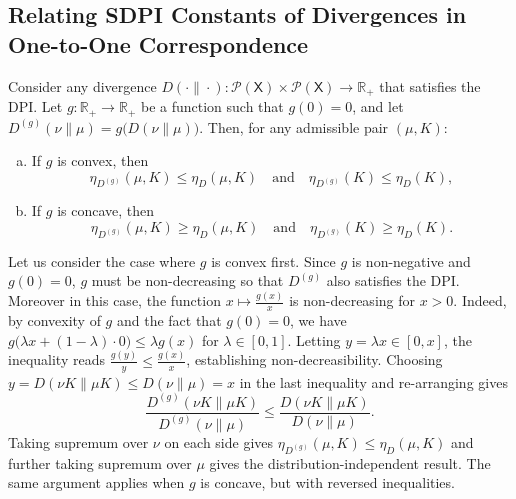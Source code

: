 \documentclass[conference,letterpaper]{IEEEtran}
\def \X{\mathsf X}
\def \calP{\mathcal P}
\def \reals {\mathbb R}
\begin{document}
\subsection{Relating SDPI Constants of Divergences in One-to-One Correspondence}\label{appendix:sdpi_relationship_concave_function}\noindent
    \begin{lemma}\label{lemma:sdpi_relationship_concave_function}
        Consider any divergence ${D(\cdot\|\cdot):\calP(\X)\times\calP(\X)\to\reals_+}$ that satisfies the DPI. Let ${g:\reals_+\to\reals_+}$ be a function such that $g(0)=0$, and let $D^{(g)}(\nu\|\mu)=g\big(D(\nu\|\mu)\big)$. Then, for any admissible pair $(\mu, K)$:
        \begin{enumerate}[a)]
            \item If $g$ is convex, then
            \begin{equation*}
                \eta_{D^{(g)}}(\mu, K) \leq \eta_{D}(\mu, K)\quad\text{and}\quad    \eta_{D^{(g)}}(K) \leq \eta_{D}(K),
            \end{equation*}
            
            \item If $g$ is concave, then
            \begin{equation*}
                \eta_{D^{(g)}}(\mu, K) \geq \eta_{D}(\mu, K)\quad\text{and}\quad  \eta_{D^{(g)}}(K) \geq \eta_{D}(K).
            \end{equation*}
        \end{enumerate}
    \end{lemma}
    \begin{IEEEproof}
        Let us consider the case where $g$ is convex first. Since $g$ is non-negative and $g(0)=0$, $g$ must be non-decreasing so that $D^{(g)}$ also satisfies the DPI. Moreover in this case, the function $x\mapsto\frac{g(x)}{x}$ is non-decreasing for $x>0$. Indeed, by convexity of $g$ and the fact that $g(0)=0$, we have $g\big(\lambda x+(1-\lambda)\cdot0\big)\leq \lambda g(x)$ for $\lambda\in[0,1]$. Letting $y=\lambda x\in[0, x]$, the inequality reads $\frac{g(y)}{y}\leq\frac{g(x)}{x}$, establishing non-decreasibility. Choosing $y=D(\nu K\|\mu K) \leq D(\nu\|\mu)=x$ in the last inequality and re-arranging gives
        \begin{equation*}
            \frac{D^{(g)}(\nu K\|\mu K)}{D^{(g)}(\nu\|\mu)}\leq\frac{D(\nu K\|\mu K)}{D(\nu\|\mu)}.
        \end{equation*}
        Taking supremum over $\nu$ on each side gives $\eta_{D^{(g)}}(\mu, K) \leq \eta_{D}(\mu, K)$ and further taking supremum over $\mu$ gives the distribution-independent result. The same argument applies when $g$ is concave, but with reversed inequalities.
    \end{IEEEproof}
\end{document}
